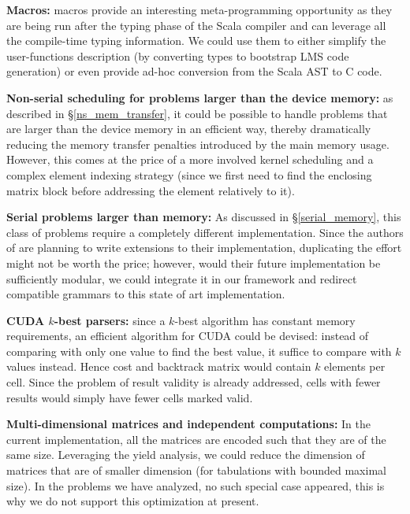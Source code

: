 \ole
\item \textbf{Macros:} macros provide an interesting meta-programming opportunity as they are being run after the typing phase of the Scala compiler and can leverage all the compile-time typing information. We could use them to either simplify the user-functions description (by converting types to bootstrap LMS code generation) or even provide ad-hoc conversion from the Scala AST to C code.
\item \textbf{Non-serial scheduling for problems larger than the device memory:} as described in \S\ref{ns_mem_transfer}, it could be possible to handle problems that are larger than the device memory in an efficient way, thereby dramatically reducing the memory transfer penalties introduced by the main memory usage. However, this comes at the price of a more involved kernel scheduling and a complex element indexing strategy (since we first need to find the enclosing matrix block before addressing the element relatively to it).
\item \textbf{Serial problems larger than memory:} As discussed in \S\ref{serial_memory}, this class of problems require a completely different implementation. Since the authors of \cite{swat_mega} are planning to write extensions to their implementation, duplicating the effort might not be worth the price; however, would their future implementation be sufficiently modular, we could integrate it in our framework and redirect compatible grammars to this state of art implementation.
\item \textbf{CUDA $k$-best parsers:} since a $k$-best algorithm has constant memory requirements, an efficient algorithm for CUDA could be devised: instead of comparing with only one value to find the best value, it suffice to compare with $k$ values instead. Hence cost and backtrack matrix would contain $k$ elements per cell. Since the problem of result validity is already addressed, cells with fewer results would simply have fewer cells marked valid.
\item \textbf{Multi-dimensional matrices and independent computations:} In the current implementation, all the matrices are encoded such that they are of the same size. Leveraging the yield analysis, we could reduce the dimension of matrices that are of smaller dimension (for tabulations with bounded maximal size). In the problems we have analyzed, no such special case appeared, this is why we do not support this optimization at present.

